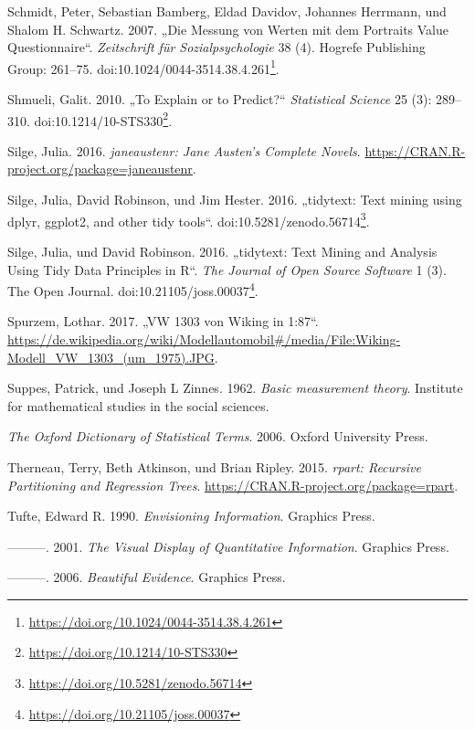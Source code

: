 \documentclass[12pt,ngerman,]{book}
\let\rmarkdownfootnote\footnote%
\def\footnote{\protect\rmarkdownfootnote}
\renewcommand{\href}[2]{#2\footnote{\url{#1}}}
\theoremstyle{definition}
\theoremstyle{definition}
\theoremstyle{remark}
\begin{document}
\hypertarget{ref-Schmidt2007}{}
Schmidt, Peter, Sebastian Bamberg, Eldad Davidov, Johannes Herrmann, und
Shalom H. Schwartz. 2007. „Die Messung von Werten mit dem Portraits
Value Questionnaire``. \emph{Zeitschrift für Sozialpsychologie} 38 (4).
Hogrefe Publishing Group: 261--75.
doi:\href{https://doi.org/10.1024/0044-3514.38.4.261}{10.1024/0044-3514.38.4.261}.

\hypertarget{ref-Shmueli2010}{}
Shmueli, Galit. 2010. „To Explain or to Predict?`` \emph{Statistical
Science} 25 (3): 289--310.
doi:\href{https://doi.org/10.1214/10-STS330}{10.1214/10-STS330}.

\hypertarget{ref-R-janeaustenr}{}
Silge, Julia. 2016. \emph{janeaustenr: Jane Austen's Complete Novels}.
\url{https://CRAN.R-project.org/package=janeaustenr}.

\hypertarget{ref-tidytext-archive}{}
Silge, Julia, David Robinson, und Jim Hester. 2016. „tidytext: Text
mining using dplyr, ggplot2, and other tidy tools``.
doi:\href{https://doi.org/10.5281/zenodo.56714}{10.5281/zenodo.56714}.

\hypertarget{ref-Silge2016}{}
Silge, Julia, und David Robinson. 2016. „tidytext: Text Mining and
Analysis Using Tidy Data Principles in R``. \emph{The Journal of Open
Source Software} 1 (3). The Open Journal.
doi:\href{https://doi.org/10.21105/joss.00037}{10.21105/joss.00037}.

\hypertarget{ref-spurzem_vw_2017}{}
Spurzem, Lothar. 2017. „VW 1303 von Wiking in 1:87``.
\url{https://de.wikipedia.org/wiki/Modellautomobil\#/media/File:Wiking-Modell_VW_1303_(um_1975).JPG}.

\hypertarget{ref-suppes1962basic}{}
Suppes, Patrick, und Joseph L Zinnes. 1962. \emph{Basic measurement
theory}. Institute for mathematical studies in the social sciences.

\hypertarget{ref-oxford}{}
\emph{The Oxford Dictionary of Statistical Terms}. 2006. Oxford
University Press.

\hypertarget{ref-R-rpart}{}
Therneau, Terry, Beth Atkinson, und Brian Ripley. 2015. \emph{rpart:
Recursive Partitioning and Regression Trees}.
\url{https://CRAN.R-project.org/package=rpart}.

\hypertarget{ref-1930824149}{}
Tufte, Edward R. 1990. \emph{Envisioning Information}. Graphics Press.

\hypertarget{ref-1930824130}{}
---------. 2001. \emph{The Visual Display of Quantitative Information}.
Graphics Press.

\hypertarget{ref-1930824165}{}
---------. 2006. \emph{Beautiful Evidence}. Graphics Press.
\end{document}
